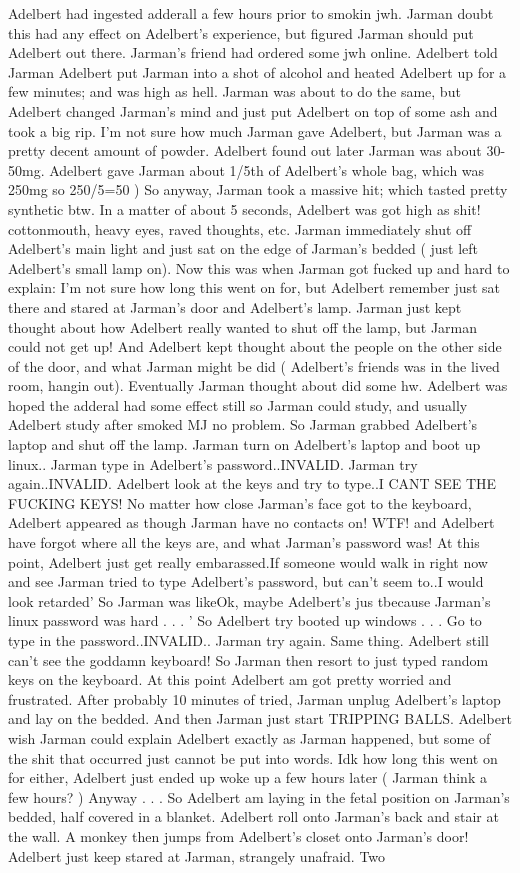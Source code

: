 \documentclass[12pt]{book}
\begin{document}
Adelbert had ingested adderall a few hours prior to smokin jwh. Jarman doubt this had any effect on Adelbert's experience, but figured Jarman should put Adelbert out there. Jarman's friend had ordered some jwh online. Adelbert told Jarman Adelbert put Jarman into a shot of alcohol and heated Adelbert up for a few minutes; and was high as hell. Jarman was about to do the same, but Adelbert changed Jarman's mind and just put Adelbert on top of some ash and took a big rip. I'm not sure how much Jarman gave Adelbert, but Jarman was a pretty decent amount of powder. Adelbert found out later Jarman was about 30-50mg. Adelbert gave Jarman about 1/5th of Adelbert's whole bag, which was 250mg so 250/5=50 ) So anyway, Jarman took a massive hit; which tasted pretty synthetic btw. In a matter of about 5 seconds, Adelbert was got high as shit! cottonmouth, heavy eyes, raved thoughts, etc. Jarman immediately shut off Adelbert's main light and just sat on the edge of Jarman's bedded ( just left Adelbert's small lamp on). Now this was when Jarman got fucked up and hard to explain: I'm not sure how long this went on for, but Adelbert remember just sat there and stared at Jarman's door and Adelbert's lamp. Jarman just kept thought about how Adelbert really wanted to shut off the lamp, but Jarman could not get up! And Adelbert kept thought about the people on the other side of the door, and what Jarman might be did ( Adelbert's friends was in the lived room, hangin out). Eventually Jarman thought about did some hw. Adelbert was hoped the adderal had some effect still so Jarman could study, and usually Adelbert study after smoked MJ no problem. So Jarman grabbed Adelbert's laptop and shut off the lamp. Jarman turn on Adelbert's laptop and boot up linux.. Jarman type in Adelbert's password..INVALID. Jarman try again..INVALID. Adelbert look at the keys and try to type..I CANT SEE THE FUCKING KEYS! No matter how close Jarman's face got to the keyboard, Adelbert appeared as though Jarman have no contacts on! WTF! and Adelbert have forgot where all the keys are, and what Jarman's password was! At this point, Adelbert just get really embarassed.If someone would walk in right now and see Jarman tried to type Adelbert's password, but can't seem to..I would look retarded' So Jarman was likeOk, maybe Adelbert's jus tbecause Jarman's linux password was hard . . .  ' So Adelbert try booted up windows . . .  Go to type in the password..INVALID.. Jarman try again. Same thing. Adelbert still can't see the goddamn keyboard! So Jarman then resort to just typed random keys on the keyboard. At this point Adelbert am got pretty worried and frustrated. After probably 10 minutes of tried, Jarman unplug Adelbert's laptop and lay on the bedded. And then Jarman just start TRIPPING BALLS. Adelbert wish Jarman could explain Adelbert exactly as Jarman happened, but some of the shit that occurred just cannot be put into words. Idk how long this went on for either, Adelbert just ended up woke up a few hours later ( Jarman think a few hours? ) Anyway . . .  So Adelbert am laying in the fetal position on Jarman's bedded, half covered in a blanket. Adelbert roll onto Jarman's back and stair at the wall. A monkey then jumps from Adelbert's closet onto Jarman's door! Adelbert just keep stared at Jarman, strangely unafraid. Two 
\end{document}
